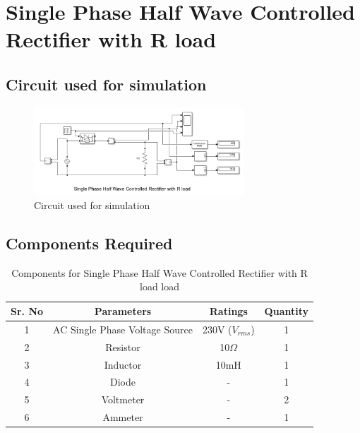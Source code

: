 \section{Single Phase Half Wave Controlled Rectifier with R load}

\subsection{Circuit used for simulation}

\begin{figure}[h]
    \centering
    \includegraphics[width=0.7\textwidth]{images/experiment-1/circuit-diagram-simulation-05.png}
    \caption{Circuit used for simulation}
    \label{Fig_simulation_circuit_single-phase-half-wave-controlled-rectifier-with-R-load}
\end{figure}

\subsection{Components Required}

\begin{table}[h]
    \renewcommand{\arraystretch}{1.3}
    \caption{Components for Single Phase Half Wave Controlled Rectifier with R load
        load}
    \label{table_components_required_circuit_5}
    \centering
    \begin{tabular}{|c|c|c|c|}
        \hline
        Sr. No & Parameters                     & Ratings            & Quantity \\
        \hline
        \hline
        1      & AC Single Phase Voltage Source & 230V ($ V_{rms} $) & 1        \\
        \hline
        2      & Resistor                       & 10$ \Omega $       & 1        \\
        \hline
        3      & Inductor                       & 10mH               & 1        \\
        \hline
        4      & Diode                          & -                  & 1        \\
        \hline
        5      & Voltmeter                      & -                  & 2        \\
        \hline
        6      & Ammeter                        & -                  & 1        \\
        \hline
    \end{tabular}
\end{table}




